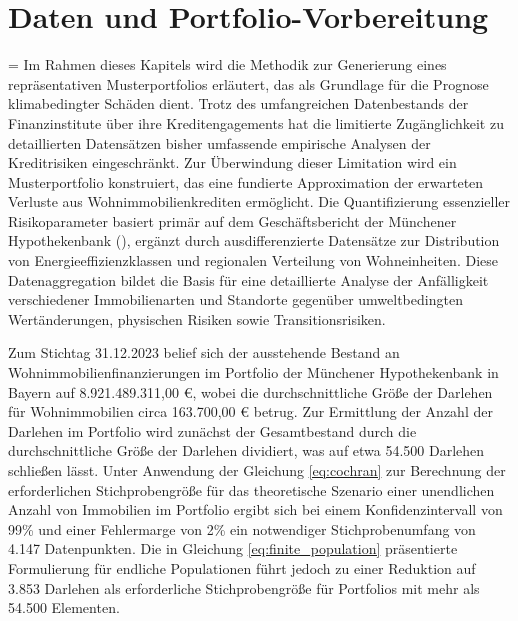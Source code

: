 \section{Daten und Portfolio-Vorbereitung}

\begin{sloppypar}
\emergencystretch=\hsize
Im Rahmen dieses Kapitels wird die Methodik zur Generierung eines repräsentativen Musterportfolios erläutert, das als Grundlage für die Prognose klimabedingter Schäden dient. Trotz des umfangreichen Datenbestands der Finanzinstitute über ihre Kredit\-engagements hat die limitierte Zugänglichkeit zu detaillierten Datensätzen bisher umfassende empirische Analysen der Kreditrisiken eingeschränkt. Zur Überwindung dieser Limitation wird ein Musterportfolio konstruiert, das eine fundierte Approximation der erwarteten Verluste aus Wohn\-immobilien\-krediten ermöglicht. Die Quantifizierung essenzieller Risikoparameter basiert primär auf dem Geschäftsbericht der Münchener Hypothekenbank (\cite{MuenchenerHyp2022}), ergänzt durch ausdifferenzierte Datensätze zur Distribution von Energie\-effizienz\-klassen und regionalen Verteilung von Wohneinheiten. Diese Datenaggregation bildet die Basis für eine detaillierte Analyse der Anfälligkeit verschiedener Immobilienarten und Standorte gegenüber umweltbedingten Wert\-änderungen, physischen Risiken sowie Transitions\-risiken.

Zum Stichtag 31.12.2023 belief sich der ausstehende Bestand an Wohnimmobilienfinanzierungen im Portfolio der Münchener Hypothekenbank in Bayern auf 8.921.489.311,00 €, wobei die durchschnittliche Größe der Darlehen für Wohnimmobilien circa 163.700,00 € betrug. Zur Ermittlung der Anzahl der Darlehen im Portfolio wird zunächst der Gesamtbestand durch die durchschnittliche Größe der Darlehen dividiert, was auf etwa 54.500 Darlehen schließen lässt. Unter Anwendung der Gleichung \ref{eq:cochran} zur Berechnung der erforderlichen Stichprobengröße für das theoretische Szenario einer unendlichen Anzahl von Immobilien im Portfolio ergibt sich bei einem Konfidenzintervall von 99\% und einer Fehlermarge von 2\% ein notwendiger Stichprobenumfang von 4.147 Datenpunkten. Die in Gleichung \ref{eq:finite_population} präsentierte Formulierung für endliche Populationen führt jedoch zu einer Reduktion auf 3.853 Darlehen als erforderliche Stichprobengröße für Portfolios mit mehr als 54.500 Elementen.


\end{sloppypar}
